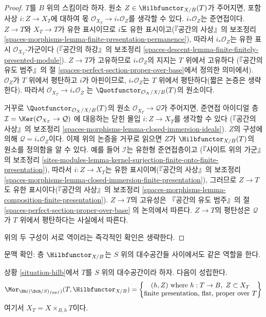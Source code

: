\begin{proof}
$T$를 $B$ 위의 스킴이라 하자. 원소
$Z \in \Hilbfunctor_{X/B}(T)$가 주어지면, 포함 사상
$i : Z \to X_T$에 대하여 몫
$\mathcal{O}_{X_T} \to i_*\mathcal{O}_Z$를 생각할 수 있다.
$i_*\mathcal{O}_Z$는 준연접이다. $Z \to T$와 $X_T \to T$가 유한
표시이므로 $i$도 유한 표시이고(『공간의 사상』의 보조정리
\ref{spaces-morphisms-lemma-finite-presentation-permanence}), 따라서
$i_*\mathcal{O}_Z$는 유한 표시 $\mathcal{O}_{X_T}$-가군이다
(『공간의 하강』의 보조정리
\ref{spaces-descent-lemma-finite-finitely-presented-module}).
$Z \to T$가 고유하므로 $i_*\mathcal{O}_Z$의 지지는 $T$ 위에서 고유하다
(『공간의 유도 범주』의 절
\ref{spaces-perfect-section-proper-over-base}에서 정의한 의미에서).
$\mathcal{O}_Z$가 $T$ 위에서 평탄하고 $i$가 아핀이므로,
$i_*\mathcal{O}_Z$는 $T$ 위에서 평탄하다(짧은 논증은 생략한다). 따라서
$\mathcal{O}_{X_T} \to i_*\mathcal{O}_Z$
는 $\Quotfunctor_{\mathcal{O}_X/X/B}(T)$의 원소이다.

\medskip\noindent
거꾸로 $\Quotfunctor_{\mathcal{O}_X/X/B}(T)$의 원소
$\mathcal{O}_{X_T} \to \mathcal{Q}$가 주어지면, 준연접 아이디얼 층
$\mathcal{I} = \Ker(\mathcal{O}_{X_T} \to \mathcal{Q})$
에 대응하는 닫힌 몰입 $i : Z \to X_T$를 생각할 수 있다
(『공간의 사상』의 보조정리
\ref{spaces-morphisms-lemma-closed-immersion-ideals}).
$Z$의 구성에 의해 $\mathcal{Q} = i_*\mathcal{O}_Z$이다.
이제 위의 논증을 거꾸로 읽으면 $Z$가 $\Hilbfunctor_{X/B}(T)$의
원소를 정의함을 알 수 있다. 예를 들어 $\mathcal{I}$는 유한형 준연접층이고
(『사이트 위의 가군』의 보조정리
\ref{sites-modules-lemma-kernel-surjection-finite-onto-finite-presentation}),
따라서 $i : Z \to X_T$는 유한 표시이며(『공간의 사상』의 보조정리
\ref{spaces-morphisms-lemma-closed-immersion-finite-presentation}),
그러므로 $Z \to T$도 유한 표시이다(『공간의 사상』의 보조정리
\ref{spaces-morphisms-lemma-composition-finite-presentation}).
$Z \to T$의 고유성은 『공간의 유도 범주』의 절
\ref{spaces-perfect-section-proper-over-base}
의 논의에서 따른다. $Z \to T$의 평탄성은 $\mathcal{Q}$가
$T$ 위에서 평탄하다는 사실에서 따른다.

\medskip\noindent
위의 두 구성이 서로 역이라는 즉각적인 확인은 생략한다.
\end{proof}

\noindent
문맥 확인: 층 $\Hilbfunctor_{X/B}$는 $S$ 위의 대수공간들 사이에서도
같은 역할을 한다.

\begin{lemma}
\label{lemma-extend-hilb-to-spaces}
상황 \ref{situation-hilb}에서 $T$를 $S$ 위의 대수공간이라 하자.
다음이 성립한다.
$$
\Mor_{\Sh((\Sch/S)_{fppf})}(T, \Hilbfunctor_{X/B}) =
\left\{
\begin{matrix}
(h, Z)\text{ where }h : T \to B,\ Z \subset X_T \\
\text{finite presentation, flat, proper over }T
\end{matrix}
\right\}
$$
여기서 $X_T = X \times_{B, h} T$이다.
\end{lemma}


